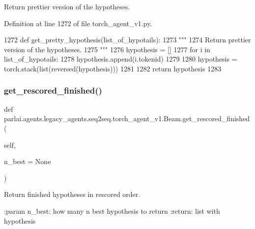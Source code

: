 \begin{DoxyVerb}Return prettier version of the hypotheses.
\end{DoxyVerb}
 

Definition at line 1272 of file torch\+\_\+agent\+\_\+v1.\+py.


\begin{DoxyCode}
1272     \textcolor{keyword}{def }get\_pretty\_hypothesis(list\_of\_hypotails):
1273         \textcolor{stringliteral}{"""}
1274 \textcolor{stringliteral}{        Return prettier version of the hypotheses.}
1275 \textcolor{stringliteral}{        """}
1276         hypothesis = []
1277         \textcolor{keywordflow}{for} i \textcolor{keywordflow}{in} list\_of\_hypotails:
1278             hypothesis.append(i.tokenid)
1279 
1280         hypothesis = torch.stack(list(reversed(hypothesis)))
1281 
1282         \textcolor{keywordflow}{return} hypothesis
1283 
\end{DoxyCode}
\mbox{\label{classparlai_1_1agents_1_1legacy__agents_1_1seq2seq_1_1torch__agent__v1_1_1Beam_a3dbc095780f560a02bfafc0e0f646ebc}} 
\subsubsection{\texorpdfstring{get\+\_\+rescored\+\_\+finished()}{get\_rescored\_finished()}}
{\footnotesize\ttfamily def parlai.\+agents.\+legacy\+\_\+agents.\+seq2seq.\+torch\+\_\+agent\+\_\+v1.\+Beam.\+get\+\_\+rescored\+\_\+finished (\begin{DoxyParamCaption}\item[{}]{self,  }\item[{}]{n\+\_\+best = {\ttfamily None} }\end{DoxyParamCaption})}

\begin{DoxyVerb}Return finished hypotheses in rescored order.

:param n_best: how many n best hypothesis to return
:return: list with hypothesis
\end{DoxyVerb}
 

